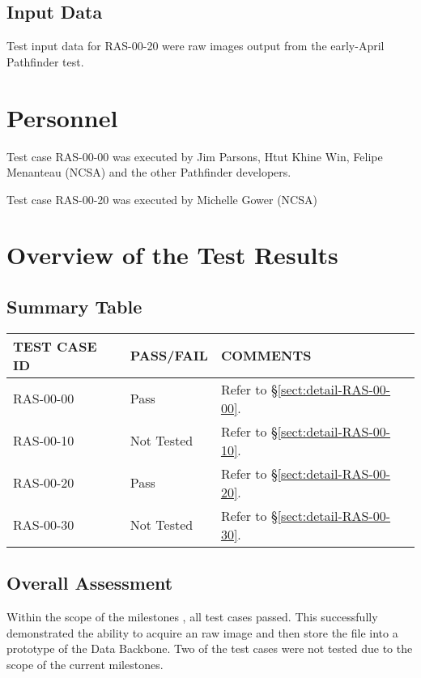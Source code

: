 \documentclass[DM,lsstdraft,STR,toc]{lsstdoc}
\begin{document}
\subsection{Input Data}
\label{sect:inputdata}

Test input data for RAS-00-20 were raw images output from the early-April Pathfinder test.

\section{Personnel}
\label{sect:personnel}

Test case RAS-00-00 was executed by Jim Parsons, Htut Khine Win, Felipe Menanteau (NCSA) and the other Pathfinder developers.

Test case RAS-00-20  was executed by Michelle Gower (NCSA)

\newpage

\section{Overview of the Test Results}
\label{sect:overview}

\subsection{Summary Table}
\label{sect:summarytable}

\begin{longtable} {|p{}|p{}|p{}|}\hline
{\bf TEST CASE ID} & {\bf PASS/FAIL} & {\bf COMMENTS} \\\hline
RAS-00-00 & Pass & Refer to \S\ref{sect:detail-RAS-00-00}. \\\hline
RAS-00-10 & Not Tested & Refer to \S\ref{sect:detail-RAS-00-10}. \\\hline
RAS-00-20 & Pass & Refer to \S\ref{sect:detail-RAS-00-20}. \\\hline
RAS-00-30 & Not Tested & Refer to \S\ref{sect:detail-RAS-00-30}. \\\hline
\end{longtable}

\subsection{Overall Assessment}
\label{sect:overallassessment}

Within the scope of the milestones \milestoneId{}, all test cases passed.
This successfully demonstrated the ability to acquire an raw image and then store the file into a 
prototype of the Data Backbone. Two of the test cases were not tested due to the scope of the
current milestones. 
\end{document}

